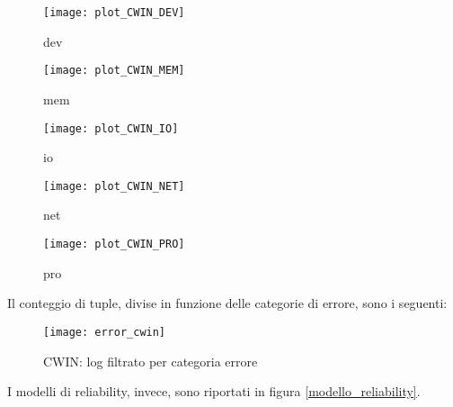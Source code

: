 \begin{minipage}{\linewidth}
  \centering
  \begin{minipage}{0.49\linewidth}
    \begin{figure}[H]
      \texttt{[image: plot\_CWIN\_DEV]}
      \caption*{dev}
    \end{figure}
  \end{minipage}
  \begin{minipage}{0.49\linewidth}
    \begin{figure}[H]
      \texttt{[image: plot\_CWIN\_MEM]}
      \caption*{mem}
    \end{figure}
  \end{minipage}
  \begin{minipage}{0.49\linewidth}
    \begin{figure}[H]
      \texttt{[image: plot\_CWIN\_IO]}
      \caption*{io}
    \end{figure}
  \end{minipage}
  \begin{minipage}{0.49\linewidth}
    \begin{figure}[H]
      \texttt{[image: plot\_CWIN\_NET]}
      \caption*{net}
    \end{figure}
  \end{minipage}
  \begin{minipage}{0.49\linewidth}
    \hspace{0.25\linewidth}
    \begin{figure}[H]
      \texttt{[image: plot\_CWIN\_PRO]}
      \caption*{pro}
    \end{figure}
  \end{minipage}
\end{minipage}
\label{cwin_categorie}

\clearpage

Il conteggio di tuple, divise in funzione delle categorie di errore, sono i
seguenti:

\begin{figure}[!htbp]
  \centering
  \texttt{[image: error\_cwin]}
  \caption{CWIN: log filtrato per categoria errore}
  \label{error_cwin}
\end{figure}

\clearpage

I modelli di reliability, invece, sono riportati in figura \ref{modello_reliability}.\\

